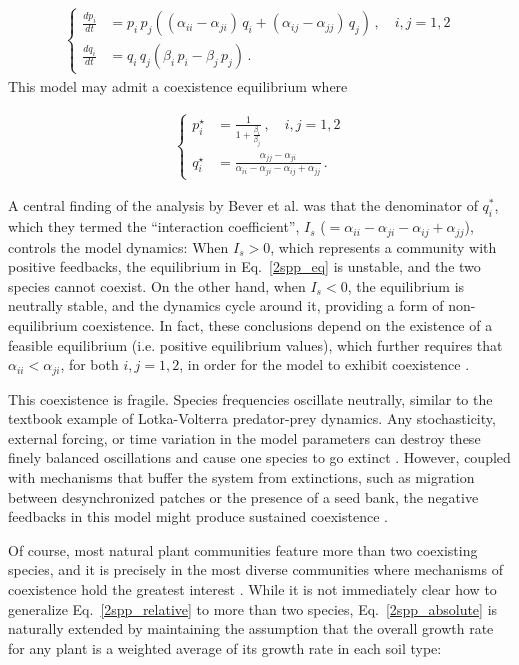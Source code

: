 \documentclass[11pt]{article}
\begin{document}
\begin{align} \label{2spp_relative}
\begin{cases}
\frac{dp_i}{dt} &= p_i \, p_j \left( (\alpha_{ii} - \alpha_{ji}) \, q_i + (\alpha_{ij} - \alpha_{jj}) \, q_j \right) \, , \quad  i, j = 1,2 \\
\frac{dq_i}{dt} &= q_i \, q_j (\beta_i \, p_i - \beta_j \, p_j) \, .
\end{cases}
\end{align}
This model may admit a coexistence equilibrium where

\begin{align} \label{2spp_eq}
\begin{cases}
p_i^\star &= \frac{1}{1 + \frac{\beta_i}{\beta_j}} \, , \quad  i, j = 1,2 \\
q_i^\star &= \frac{\alpha_{jj} - \alpha_{ji}}{\alpha_{ii} - \alpha_{ji} - \alpha_{ij} + \alpha_{jj}} \, .
\end{cases}
\end{align}

A central finding of the analysis by Bever et al. was that the denominator of $q_i^*$, which they termed the ``interaction coefficient'', $I_s$ ($= \alpha_{ii} - \alpha_{ji} - \alpha_{ij} + \alpha_{jj}$), controls the model dynamics: When $I_s > 0$, which represents a community with positive feedbacks, the equilibrium in Eq.~\ref{2spp_eq} is unstable, and the two species cannot coexist. On the other hand, when $I_s < 0$, the equilibrium is neutrally stable, and the dynamics cycle around it, providing a form of non-equilibrium coexistence. In fact, these conclusions depend on the existence of a feasible equilibrium (i.e. positive equilibrium values), which further requires that $\alpha_{ii} < \alpha_{ji}$, for both $i, j = 1, 2$, in order for the model to exhibit coexistence \cite{bever1997incorporating,ke2015incorporating}. 

This coexistence is fragile. Species frequencies oscillate neutrally, similar to the textbook example of Lotka-Volterra predator-prey dynamics. Any stochasticity, external forcing, or time variation in the model parameters can destroy these finely balanced oscillations and cause one species to go extinct \cite{revilla2013plant}. However, coupled with mechanisms that buffer the system from extinctions, such as migration between desynchronized patches or the presence of a seed bank, the negative feedbacks in this model might produce sustained coexistence \cite{revilla2013plant, bever2003soil}. 

Of course, most natural plant communities feature more than two coexisting species, and it is precisely in the most diverse communities where mechanisms of coexistence hold the greatest interest \cite{van2013plant}. While it is not immediately clear how to generalize Eq.~\ref{2spp_relative} to more than two species, Eq.~\ref{2spp_absolute} is naturally extended by maintaining the assumption that the overall growth rate for any plant is a weighted average of its growth rate in each soil type:
\end{document}
